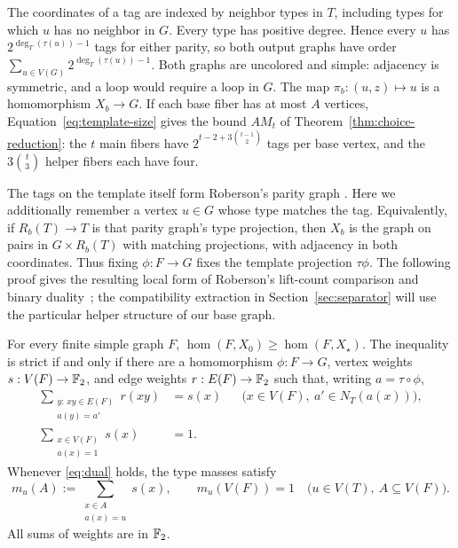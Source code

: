 The coordinates of a tag are indexed by neighbor types in \(T\),
including types for which \(u\) has no neighbor in \(G\).
Every type has positive degree. Hence every \(u\) has
\(2^{\deg_T(\tau(u))-1}\) tags for either parity, so both output graphs
have order \(\sum_{u\in V(G)}2^{\deg_T(\tau(u))-1}\).
Both graphs are uncolored and simple: adjacency is symmetric, and a
loop would require a loop in \(G\). The map
\(\pi_b:(u,z)\mapsto u\) is a homomorphism \(X_b\to G\).
If each base fiber has at most \(A\) vertices, Equation~\ref{eq:template-size}
gives the bound \(A M_t\) of Theorem~\ref{thm:choice-reduction}:
the \(t\) main fibers have \(2^{t-2+3\binom{t-1}{2}}\) tags per base vertex,
and the \(3\binom t3\) helper fibers each have four.

The tags on the template itself form Roberson's parity graph
\citep[preprint version, Definition~3.1]{Roberson2026}. Here we additionally remember a
vertex \(u\in G\) whose type matches the tag. Equivalently, if
\(R_b(T)\to T\) is that parity graph's type projection, then \(X_b\)
is the graph on pairs in \(G\times R_b(T)\) with matching projections,
with adjacency in both coordinates. Thus fixing \(\phi:F\to G\)
fixes the template projection \(\tau\phi\). The following proof gives
the resulting local form of Roberson's lift-count comparison and binary
duality~\citep[preprint version, Theorem~3.6 and Lemma~3.8]{Roberson2026}; the compatibility
extraction in Section~\ref{sec:separator} will use the particular
helper structure of our base graph.

\begin{lemma}\label{lem:lift-duality}
For every finite simple graph \(F\),
\(\hom(F,X_0)\ge\hom(F,X_\star)\).
The inequality is strict if and only if there are a homomorphism
\(\phi:F\to G\), vertex weights \(s:V(F)\to\mathbb F_2\), and edge weights
\(r:E(F)\to\mathbb F_2\) such that, writing \(a=\tau\circ\phi\),
\begin{equation}\label{eq:dual}
 \begin{aligned}
 \sum_{\substack{y:\,xy\in E(F)\\a(y)=a'}}r(xy)
   &=s(x)
   &&\bigl(x\in V(F),\ a'\in N_T(a(x))\bigr),\\
 \sum_{\substack{x\in V(F)\\a(x)=1}}s(x)&=1.
 \end{aligned}
\end{equation}
Whenever \eqref{eq:dual} holds, the type masses satisfy
\begin{equation}\label{eq:type-mass}
 m_u(A):=\sum_{\substack{x\in A\\a(x)=u}}s(x),
 \qquad
 m_u(V(F))=1
 \quad\bigl(u\in V(T),\ A\subseteq V(F)\bigr).
\end{equation}
All sums of weights are in \(\mathbb F_2\).
\end{lemma}

